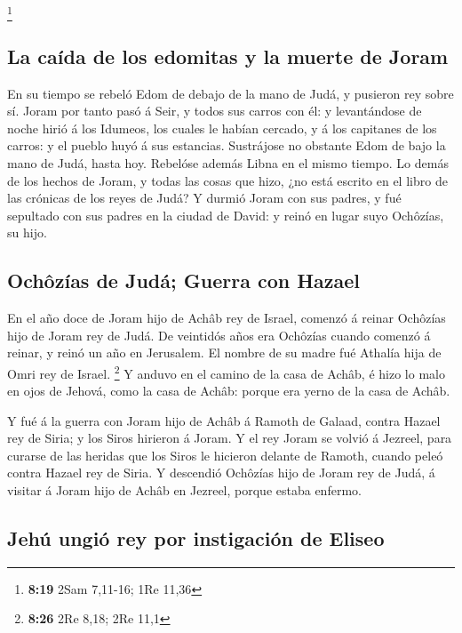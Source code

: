 \footnote{\textbf{8:19} 2Sam 7,11-16; 1Re 11,36}

\hypertarget{la-cauxedda-de-los-edomitas-y-la-muerte-de-joram}{%
\subsection{La caída de los edomitas y la muerte de
Joram}\label{la-cauxedda-de-los-edomitas-y-la-muerte-de-joram}}

 En su tiempo se rebeló Edom de debajo de la mano de
Judá, y pusieron rey sobre sí.  Joram por tanto pasó á
Seir, y todos sus carros con él: y levantándose de noche hirió á los
Idumeos, los cuales le habían cercado, y á los capitanes de los carros:
y el pueblo huyó á sus estancias.  Sustrájose no obstante
Edom de bajo la mano de Judá, hasta hoy. Rebelóse además Libna en el
mismo tiempo.  Lo demás de los hechos de Joram, y todas
las cosas que hizo, ¿no está escrito en el libro de las crónicas de los
reyes de Judá?  Y durmió Joram con sus padres, y fué
sepultado con sus padres en la ciudad de David: y reinó en lugar suyo
Ochôzías, su hijo.

\hypertarget{ochuxf4zuxedas-de-juduxe1-guerra-con-hazael}{%
\subsection{Ochôzías de Judá; Guerra con
Hazael}\label{ochuxf4zuxedas-de-juduxe1-guerra-con-hazael}}

 En el año doce de Joram hijo de Achâb rey de Israel,
comenzó á reinar Ochôzías hijo de Joram rey de Judá.  De
veintidós años era Ochôzías cuando comenzó á reinar, y reinó un año en
Jerusalem. El nombre de su madre fué Athalía hija de Omri rey de Israel.
\footnote{\textbf{8:26} 2Re 8,18; 2Re 11,1}  Y anduvo en
el camino de la casa de Achâb, é hizo lo malo en ojos de Jehová, como la
casa de Achâb: porque era yerno de la casa de Achâb.

 Y fué á la guerra con Joram hijo de Achâb á Ramoth de
Galaad, contra Hazael rey de Siria; y los Siros hirieron á Joram.
 Y el rey Joram se volvió á Jezreel, para curarse de las
heridas que los Siros le hicieron delante de Ramoth, cuando peleó contra
Hazael rey de Siria. Y descendió Ochôzías hijo de Joram rey de Judá, á
visitar á Joram hijo de Achâb en Jezreel, porque estaba enfermo.

\hypertarget{jehuxfa-ungiuxf3-rey-por-instigaciuxf3n-de-eliseo}{%
\subsection{Jehú ungió rey por instigación de
Eliseo}\label{jehuxfa-ungiuxf3-rey-por-instigaciuxf3n-de-eliseo}}

